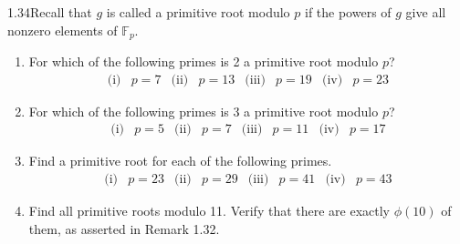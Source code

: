 \begin{exercise}
    {1.34}Recall that \( g \) is called a primitive root modulo \( p \) if the powers of \( g \) give all nonzero elements of \( \mathbb{F}_p \).
    \begin{enumerate}[label=(\alph*)]
        \item For which of the following primes is 2 a primitive root modulo \( p \)?
              \[
                  \begin{array}{llllllll}
                      \text{(i)} & p = 7 & \text{(ii)} & p = 13 & \text{(iii)} & p = 19 & \text{(iv)} & p = 23
                  \end{array}
              \]
        \item For which of the following primes is 3 a primitive root modulo \( p \)?
              \[
                  \begin{array}{llllllll}
                      \text{(i)} & p = 5 & \text{(ii)} & p = 7 & \text{(iii)} & p = 11 & \text{(iv)} & p = 17
                  \end{array}
              \]
        \item Find a primitive root for each of the following primes.
              \[
                  \begin{array}{llllllll}
                      \text{(i)} & p = 23 & \text{(ii)} & p = 29 & \text{(iii)} & p = 41 & \text{(iv)} & p = 43
                  \end{array}
              \]
        \item Find all primitive roots modulo 11. Verify that there are exactly \(\phi(10)\) of them, as asserted in Remark 1.32.
    \end{enumerate}
\end{exercise}

